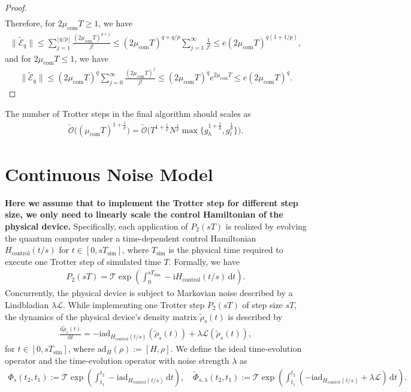 \documentclass[11pt]{article}
\renewcommand{\i}{\mathrm{i}}
\renewcommand{\d}{\mathrm{d}}
\renewcommand{\L}{\mathcal{L}}
\newcommand{\ad}{\mathrm{ad}}
\newcommand{\T}{\mathcal{T}}
\newcommand{\B}{\Big}
\newcommand{\simu}{\mathrm{sim}}
\newcommand{\Hc}{H_{\mathrm{control}}}
\renewcommand{\O}{\mathcal{O}}
\newcommand{\E}{\mathcal{E}}
\newcommand{\com}{\mathrm{com}}
\begin{document}
\begin{proof}
\begin{align*}
\end{align*}
Therefore, for $2\mu_{\com}T\ge 1$, we have \begin{align*}
    \big\|\tilde{\E}_{q}\big\|\le \sum_{j=1}^{\lfloor q/p\rfloor }\frac{(2\mu_{\com}T)^{q+j}}{j!} 
    \le (2\mu_{\com}T)^{q+q/p}\sum_{j=1}^{\infty}\frac{1}{j!}\le e(2\mu_{\com}T)^{q(1+1/p)} ,
\end{align*}
and for $2\mu_{\com}T\le 1$, we have \begin{align*}
    \big\|\tilde{\E}_{q}\big\| \le (2\mu_{\com}T)^{q}\sum_{j=0}^{\infty}\frac{ (2\mu_{\com}T)^{j}}{j!}\le (2\mu_{\com}T)^{q} e^{2\mu_{\com}T}\le e(2\mu_{\com}T)^{q}.
\end{align*}

\end{proof}

The number of Trotter steps in the final algorithm should scales as \begin{align*}
    \tilde{\O}\B((\mu_{\com}T)^{1+\frac{1}{p}}\B) =  \tilde{\O}\B(T^{1+\frac{1}{p}} N^{\frac{1}{p}}\max\B\{g_h^{1+\frac{1}{p}}, g_l^{\frac{1}{p}}\B\}\B).
\end{align*}


\section{Continuous Noise Model}
\textbf{Here we assume that to implement the Trotter step for different step size, we only need to linearly scale the control Hamiltonian of the physical device.} Specifically, each application of $P_2(sT)$ is realized by evolving the quantum computer under a time-dependent control Hamiltonian $\Hc(t/s)$ for $t\in [0, sT_{\simu}]$, where $T_{\simu}$ is the physical time required to execute one Trotter step of simulated time $T$. Formally, we have \begin{align*}
    P_2(sT) = \T \exp(\int_{0}^{sT_{\simu}} - \i \Hc(t/s) \, \d t).
\end{align*}
Concurrently, the physical device is subject to Markovian noise described by a Lindbladian $\lambda \L$. While implementing one Trotter step $P_2(sT)$ of step size $sT$, the dynamics of the physical device's density matrix $\tilde{\rho}_s(t)$ is described by \begin{align*}
    \frac{\d \tilde{\rho}_s(t)}{\d t} = -\i\ad_{\Hc(t/s)}(\tilde{\rho}_s(t))+\lambda \L(\tilde{\rho}_s(t)),
\end{align*}
for $t\in[0, sT_{\simu}]$, where $\ad_H(\rho) :=[H,\rho]$.
We define the ideal time-evolution operator and the time-evolution operator with noise strength $\lambda$ as \begin{align*}
    \Phi_s(t_2,t_1):=\T \exp(\int_{t_1}^{t_2} -\i\ad_{\Hc(t/s)}\,\d t),\quad \tilde{\Phi}_{s,\lambda}(t_2, t_1):=\T \exp(\int_{t_1}^{t_2}(-\i \ad_{\Hc(t/s)}+\lambda \L)\,\d t). 
\end{align*}
\end{document}

